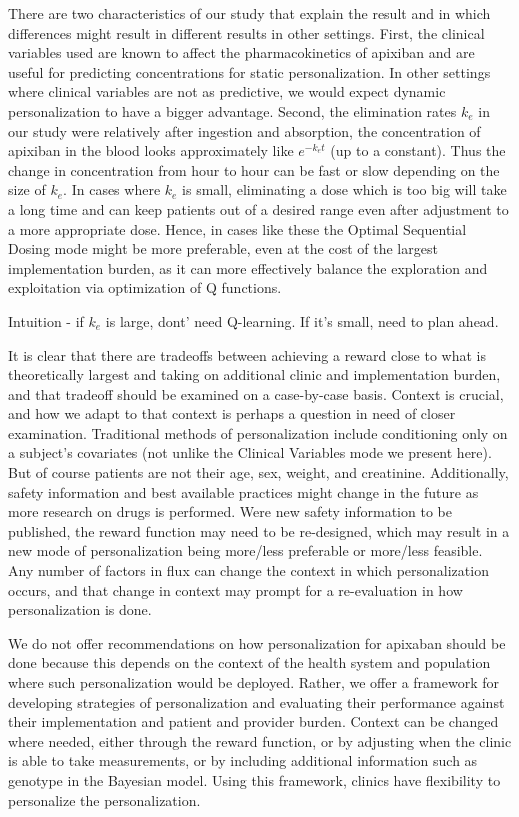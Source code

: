 There are two characteristics of our study that explain the result and in which differences might result in different results in other settings. First, the clinical variables used are known to affect the pharmacokinetics of apixiban and are useful for predicting concentrations for static personalization. In other settings where clinical variables are not as predictive, we would expect dynamic personalization to have a bigger advantage. Second, the elimination rates $k_e$ in our study were relatively after ingestion and absorption, the concentration of apixiban in the blood looks approximately like $e^{-k_e t}$ (up to a constant).  Thus the change in concentration from hour to hour can be fast or slow depending on the size of $k_e$.  In cases where $k_e$ is small, eliminating a dose which is too big will take a long time and can keep patients out of a desired range even after adjustment to a more appropriate dose.  Hence, in cases like these the Optimal Sequential Dosing mode might be more preferable, even at the cost of the largest implementation burden, as it can more effectively balance the exploration and exploitation via optimization of Q functions.


Intuition - if $k_e$ is large, dont' need Q-learning. If it's small, need to plan ahead.

It is clear that there are tradeoffs between achieving a reward close to what is theoretically largest and taking on additional clinic and implementation burden, and that tradeoff should be examined on a case-by-case basis.  Context is crucial, and how we adapt to that context is perhaps a question in need of closer examination.  Traditional methods of personalization include conditioning only on a subject’s covariates (not unlike the Clinical Variables mode we present here).  But of course patients are not their age, sex, weight, and creatinine.  Additionally, safety information and best available practices might change in the future as more research on drugs is performed. Were new safety information to be published, the reward function may need to be re-designed, which may result in a new mode of personalization being more/less preferable or more/less feasible.  Any number of factors in flux can change the context in which personalization occurs, and that change in context may prompt for a re-evaluation in how personalization is done.

We do not offer recommendations on how personalization for apixaban should be done because this depends on the context of the health system and population where such personalization would be deployed. Rather, we offer  a framework for developing strategies of personalization and evaluating their performance against their implementation and patient and provider burden.  Context can be changed where needed, either through the reward function, or by adjusting when the clinic is able to take measurements, or by including additional information such as genotype in the Bayesian model.  Using this framework, clinics have flexibility to personalize the personalization.



